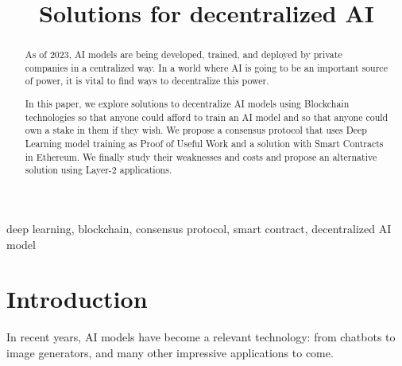 \documentclass[conference]{IEEEtran}
\begin{document}
\title{Solutions for decentralized AI\\
}

\author{
\and
{}
\and
{}
}
\maketitle

\begin{abstract}
    As of 2023, AI models are being developed, trained, and deployed by private companies in a centralized way. In a world where AI is going to be an important source of power, it is vital to find ways to decentralize this power.
    
    In this paper, we explore solutions to decentralize AI models using Blockchain technologies so that anyone could afford to train an AI model and so that anyone could own a stake in them if they wish. We propose a consensus protocol that uses Deep Learning model training as Proof of Useful Work and a solution with Smart Contracts in Ethereum. We finally study their weaknesses and costs and propose an alternative solution using Layer-2 applications.
    \end{abstract}
    
    \begin{IEEEkeywords}
    deep learning, blockchain, consensus protocol, smart contract, decentralized AI model
    \end{IEEEkeywords}
    
    \section{Introduction}
    In recent years, AI models have become a relevant technology: from chatbots to image generators, and many other impressive applications to come.
    
\end{document}
